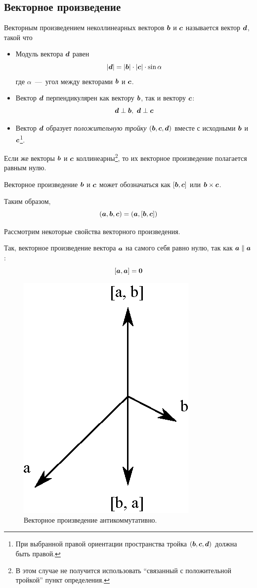 \documentclass[a4paper,12pt]{article}
\begin{document}
  \subsection{Векторное произведение}
  
  \begin{definition}
    Векторным произведением неколлинеарных векторов $\boldsymbol b$ и $\boldsymbol c$ называется вектор $\boldsymbol d$, такой что
    \begin{itemize}
      \item Модуль вектора $\boldsymbol d$ равен
      \[
        |\boldsymbol d| = |\boldsymbol b| \cdot |\boldsymbol c| \cdot \sin\alpha
      \]
      где $\alpha$~---~угол между векторами $\boldsymbol b$ и $\boldsymbol c$.
      
      \item Вектор $\boldsymbol d$ перпендикулярен как вектору $\boldsymbol b$, так и вектору $\boldsymbol c$:
      \[
        \boldsymbol d \perp \boldsymbol b,\ \boldsymbol d \perp \boldsymbol c
      \]
      
      \item Вектор $\boldsymbol d$ образует \emph{положительную тройку} $(\boldsymbol b, \boldsymbol c, \boldsymbol d)$ вместе с исходными $\boldsymbol b$ и $\boldsymbol c$\footnote{При выбранной правой ориентации пространства тройка $(\boldsymbol b, \boldsymbol c, \boldsymbol d)$ должна быть правой.}.
    \end{itemize}
    
    Если же векторы $\boldsymbol b$ и $\boldsymbol c$ коллинеарны\footnote{В этом случае не получится использовать ``связанный с положительной тройкой'' пункт определения.}, то их векторное произведение полагается равным нулю.
    
    Векторное произведение $\boldsymbol b$ и $\boldsymbol c$ может обозначаться как $[\boldsymbol b, \boldsymbol c]$ или $\bds b \hm\times \bds c$.
  \end{definition}
  
  Таким образом,
  \begin{equation}\label{eq:triple-as-scalar-and-vector}
    (\boldsymbol a, \boldsymbol b, \boldsymbol c) = (\boldsymbol a, [\boldsymbol b, \boldsymbol c])
  \end{equation}
  
  Рассмотрим некоторые свойства векторного произведения.
  
  Так, векторное произведение вектора $\boldsymbol a$ на самого себя равно нулю, так как $\bds a \hm\parallel \bds a$:
  \[
    [\boldsymbol a, \boldsymbol a] = \boldsymbol 0
  \]
  
  \begin{figure}[h]
    \centering
    
    \includegraphics[width=0.25\columnwidth]{ab-ba}
    
    \caption{Векторное произведение антикоммутативно.}
    \label{fig:ab-ba}
  \end{figure}
    
\end{document}
